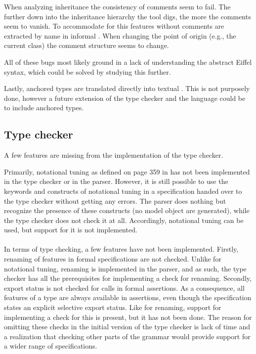 When analyzing inheritance the consistency of comments seem to fail. The further down into the inheritance hierarchy the tool digs, the more the comments seem to vanish. To accommodate for this features without comments are extracted by name in informal \bon. When changing the point of origin (e.g., the current class) the comment structure seems to change.

All of these bugs most likely ground in a lack of understanding the abstract Eiffel syntax, which could be solved by studying this further.

Lastly, anchored types are translated directly into textual \bon. This is not purposely done, however a future extension of the type checker and the \bon{} language could be to include anchored types.

\subsection{Type checker}
A few features are missing from the implementation of the type checker.

Primarily, notational tuning as defined on page 359 in \cite{walden1995} has not been implemented in the type checker or in the parser. However, it is still possible to use the keywords and constructs of notational tuning in a specification handed over to the type checker without getting any errors. The parser does nothing but recognize the presence of these constructs (no model object are generated), while the type checker does not check it at all. Accordingly, notational tuning can be used, but support for it is not implemented.
\paragraph{}
In terms of type checking, a few features have not been implemented. Firstly, renaming of features in formal specifications are not checked. Unlike for notational tuning, renaming is implemented in the parser, and as such, the type checker has all the prerequisites for implementing a check for renaming. Secondly, export status is not checked for calls in formal assertions. As a consequence, all features of a type are always available in assertions, even though the specification states an explicit selective export status. Like for renaming, support for implementing a check for this is present, but it has not been done. The reason for omitting these checks in the initial version of the type checker is lack of time and a realization that checking other parts of the grammar would provide support for a wider range of specifications.
